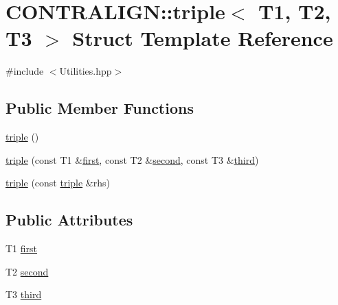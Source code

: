 \hypertarget{struct_c_o_n_t_r_a_l_i_g_n_1_1triple}{\section{C\+O\+N\+T\+R\+A\+L\+I\+G\+N\+:\+:triple$<$ T1, T2, T3 $>$ Struct Template Reference}
\label{struct_c_o_n_t_r_a_l_i_g_n_1_1triple}
}


{\ttfamily \#include $<$Utilities.\+hpp$>$}

\subsection*{Public Member Functions}
\begin{DoxyCompactItemize}
\item 
\hyperlink{struct_c_o_n_t_r_a_l_i_g_n_1_1triple_a3bdf8136df773fff422b4cbb354cf749}{triple} ()
\item 
\hyperlink{struct_c_o_n_t_r_a_l_i_g_n_1_1triple_a8da4925a9c7fe1816a9518d026131ecc}{triple} (const T1 \&\hyperlink{struct_c_o_n_t_r_a_l_i_g_n_1_1triple_a28cd5ceccab23ab8628d2c5e40147c44}{first}, const T2 \&\hyperlink{struct_c_o_n_t_r_a_l_i_g_n_1_1triple_a332bdb4bd1b4f90c53bec3c7e6bd41ff}{second}, const T3 \&\hyperlink{struct_c_o_n_t_r_a_l_i_g_n_1_1triple_a1ca35d32af351799a3b1132ad6f9ecfd}{third})
\item 
\hyperlink{struct_c_o_n_t_r_a_l_i_g_n_1_1triple_adc74ee1260c2379a96f07a9182c0ad9a}{triple} (const \hyperlink{struct_c_o_n_t_r_a_l_i_g_n_1_1triple}{triple} \&rhs)
\end{DoxyCompactItemize}
\subsection*{Public Attributes}
\begin{DoxyCompactItemize}
\item 
T1 \hyperlink{struct_c_o_n_t_r_a_l_i_g_n_1_1triple_a28cd5ceccab23ab8628d2c5e40147c44}{first}
\item 
T2 \hyperlink{struct_c_o_n_t_r_a_l_i_g_n_1_1triple_a332bdb4bd1b4f90c53bec3c7e6bd41ff}{second}
\item 
T3 \hyperlink{struct_c_o_n_t_r_a_l_i_g_n_1_1triple_a1ca35d32af351799a3b1132ad6f9ecfd}{third}
\end{DoxyCompactItemize}


